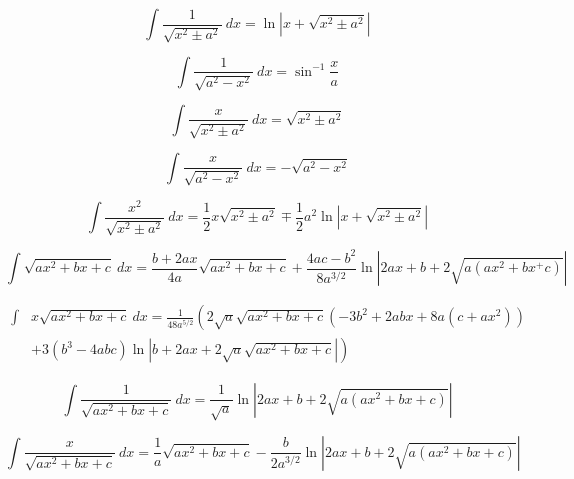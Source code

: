\begin{equation}
\int \frac{1}{\sqrt{x^2 \pm a^2}}\ dx = \ln \left | x + \sqrt{x^2 \pm a^2} \right | 
\end{equation}

\begin{equation}
\int \frac{1}{\sqrt{a^2 - x^2}}\ dx = \sin^{-1}\frac{x}{a} 
\end{equation}

\begin{equation}
\int \frac{x}{\sqrt{x^2\pm a^2}}\ dx = \sqrt{x^2 \pm a^2} 
\end{equation}

\begin{equation}
\int \frac{x}{\sqrt{a^2-x^2}}\ dx = -\sqrt{a^2-x^2} 
\end{equation}

\begin{equation}\label{eq:Russ}
\int \frac{x^2}{\sqrt{x^2 \pm a^2}}\ dx = \frac{1}{2}x\sqrt{x^2 \pm a^2}
\mp \frac{1}{2}a^2 \ln \left| x + \sqrt{x^2\pm a^2} \right | 
\end{equation}

\begin{equation}\label{eq:Winokur1}
\int \sqrt{a x^2 + b x + c}\ dx = 
\frac{b+2ax}{4a}\sqrt{ax^2+bx+c}
+
\frac{4ac-b^2}{8a^{3/2}}\ln \left| 2ax + b + 2\sqrt{a(ax^2+bx^+c)}\right |
\end{equation}

\begin{equation}\label{eq:Larry-Morris}\begin{split}
\int &x \sqrt{a x^2 + bx + c}\ dx = \frac{1}{48a^{5/2}}\left ( 
2 \sqrt{a} \sqrt{ax^2+bx+c}
\right .  
  \left( - 3b^2 + 2 abx + 8 a(c+ax^2) \right)
\\ &  \left.
 + 3(b^3-4abc)\ln \left|b + 2ax + 2\sqrt{a}\sqrt{ax^2+bx+c} \right| \right)
 \end{split}
\end{equation}

\begin{equation}
\int\frac{1}{\sqrt{ax^2+bx+c}}\ dx=
\frac{1}{\sqrt{a}}\ln \left| 2ax+b + 2 \sqrt{a(ax^2+bx+c)} \right | 
\end{equation}

\begin{equation}\label{eq:Duley}
\int \frac{x}{\sqrt{ax^2+bx+c}}\ dx=
\frac{1}{a}\sqrt{ax^2+bx + c} 
-
\frac{b}{2a^{3/2}}\ln \left| 2ax+b + 2 \sqrt{a(ax^2+bx+c)} \right |
\end{equation}

